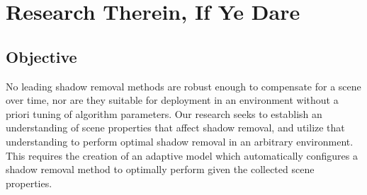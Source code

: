\documentclass[12pt]{report}
\begin{document}
\section{Research Therein, If Ye Dare}

\subsection{Objective}

No leading shadow removal methods are robust enough to compensate for a scene over time, nor are they suitable for deployment in an environment without a priori tuning of algorithm parameters. Our research seeks to establish an understanding of scene properties that affect shadow removal, and utilize that understanding to perform optimal shadow removal in an arbitrary environment. This requires the creation of an adaptive model which automatically configures a shadow removal method to optimally perform given the collected scene properties.


\end{document}
